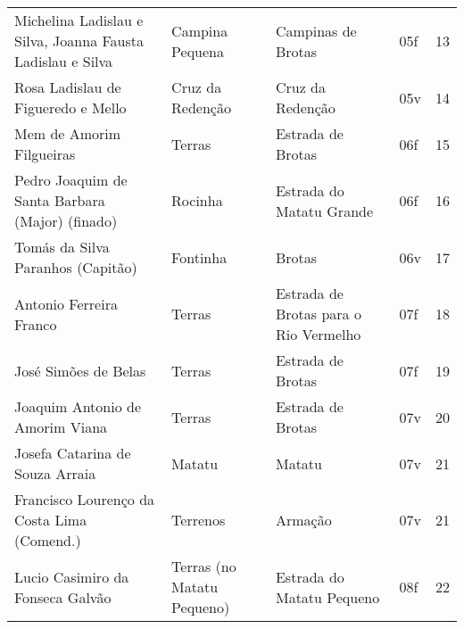 \begin{table}[!htp]
{\begin{minipage}{\textwidth}
\begin{tiny}
\begin{tabular}{p{4cm}p{4cm}p{4cm}ll}
Michelina Ladislau e Silva, Joanna Fausta Ladislau e Silva			&Campina Pequena			&Campinas de Brotas			&05f			&13			\\
Rosa Ladislau de Figueredo e Mello						&Cruz da Redenção			&Cruz da Redenção			&05v			&14			\\
Mem de Amorim Filgueiras							&Terras					&Estrada de Brotas			&06f			&15			\\
Pedro Joaquim de Santa Barbara (Major) (finado)					&Rocinha				&Estrada do Matatu Grande		&06f			&16			\\
Tomás da Silva Paranhos (Capitão)						&Fontinha				&Brotas					&06v			&17			\\
Antonio Ferreira Franco								&Terras					&Estrada de Brotas para o Rio Vermelho	&07f			&18			\\
José Simões de Belas								&Terras					&Estrada de Brotas			&07f			&19			\\
Joaquim Antonio de Amorim Viana							&Terras					&Estrada de Brotas			&07v			&20			\\
Josefa Catarina de Souza Arraia							&Matatu					&Matatu					&07v			&21			\\
Francisco Lourenço da Costa Lima (Comend.)					&Terrenos				&Armação				&07v			&21			\\
Lucio Casimiro da Fonseca Galvão						&Terras (no Matatu Pequeno)		&Estrada do Matatu Pequeno		&08f			&22			\\
\bottomrule
\end{tabular} 
\end{tiny}
\end{minipage}
}
{}
\end{table}

